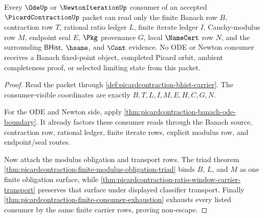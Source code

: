 \begin{theorem}
\label{thm:picardcontraction-banach-ode-consumer-nonescape}
Every $\OdeUp$ or $\NewtonIterationUp$ consumer of an accepted
$\PicardContractionUp$ packet can read only the finite Banach row $B$,
contraction row $T$, rational ratio ledger $L$, finite iterate ledger $I$,
Cauchy-modulus row $M$, endpoint seal $E$, $\Pkg$ provenance $G$, local
$\NameCert$ row $N$, and the surrounding $\mathsf{BHist}$, $\hsame$, and
$\Cont$ evidence. No ODE or Newton consumer receives a Banach fixed-point
object, completed Picard orbit, ambient completeness proof, or selected
limiting state from this packet.
\end{theorem}
\begin{proof}
Read the packet through \autoref{def:picardcontraction-bhist-carrier}. The
consumer-visible coordinates are exactly $B,T,L,I,M,E,H,C,G,N$.

For the ODE and Newton side, apply
\autoref{thm:picardcontraction-banach-ode-boundary}. It already factors these
consumer reads through the Banach source, contraction row, rational ledger,
finite iterate rows, explicit modulus row, and endpoint/seal routes.

Now attach the modulus obligation and transport rows. The triad theorem
\autoref{thm:picardcontraction-finite-modulus-obligation-triad} binds $B$,
$L$, and $M$ as one finite obligation surface, while
\autoref{thm:picardcontraction-ratio-window-carrier-transport} preserves that
surface under displayed classifier transport. Finally
\autoref{thm:picardcontraction-finite-consumer-exhaustion} exhausts every
listed consumer by the same finite carrier rows, proving non-escape.
\end{proof}

